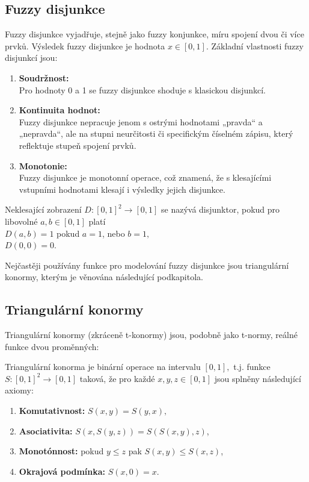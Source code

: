 \subsection{Fuzzy disjunkce} 
Fuzzy disjunkce vyjadřuje, stejně jako fuzzy konjunkce, míru spojení dvou či více prvk\r u. Výsledek fuzzy disjunkce je hodnota $x \in [0,1].$ 
Základní vlastnosti fuzzy disjunkcí jsou:
\begin{enumerate}
    \item \textbf{Soudržnost:}\\
    Pro hodnoty 0 a 1 se fuzzy disjunkce shoduje s klasickou disjunkcí.
    \item \textbf{Kontinuita hodnot:}\\
    Fuzzy disjunkce nepracuje jenom s  ostrými hodnotami „pravda“ a „nepravda“, ale na stupni neurčitosti či specifickým číselném zápisu, který reflektuje stupeň spojení prvk\r u.
   \item \textbf{Monotonie:}\\
    Fuzzy disjunkce je monotonní operace, což znamená, že s klesajícími vstupními hodnotami klesají i výsledky jejich disjunkce.
\end{enumerate}

\begin{definition}
    \cite{Kolo}
    Neklesající zobrazení $D: [0,1]^2 \rightarrow [0,1]$ se nazývá disjunktor, pokud pro libovolné $a, b \in [0,1]$ platí\\ $D(a,b) = 1$ pokud  $a = 1$, nebo  $b = 1,$\\
    $D(0,0) = 0.$
\end{definition}

Nej\v cast\v eji pou\v z\'iv\'any funkce pro modelov\'an\'i fuzzy disjunkce jsou triangul\'arn\'i konormy, kter\'ym je v\v enov\'ana n\'asleduj\'ic\'i podkapitola.

\subsection{Triangul\'arn\'i konormy} 
\label{sec: Triangulární konormy}

Triangulární konormy (zkráceně t-konormy) jsou, podobn\v e jako  t-normy, re\'aln\'e funkce dvou prom\v enn\'ych:
\begin{definition}
    Triangulární konorma je binární operace na intervalu $[0,1],$ t.j. funkce $S: [0,1]^2 \rightarrow [0,1]$ taková, že pro každé $x, y, z \in [0,1]$ jsou splněny následující axiomy:
    \begin{enumerate}
        \item \textbf{Komutativnost: } $S(x,y) = S(y,x),$
        \item \textbf{Asociativita: } $S(x,S(y,z)) = S(S(x,y),z)$,
        \item \textbf{Monotónnost:} pokud $y \leq z$ pak $S(x, y) \leq S(x, z)$,
        \item \textbf{Okrajová podmínka: } $S(x,0) = x.$
    \end{enumerate}
\end{definition}

